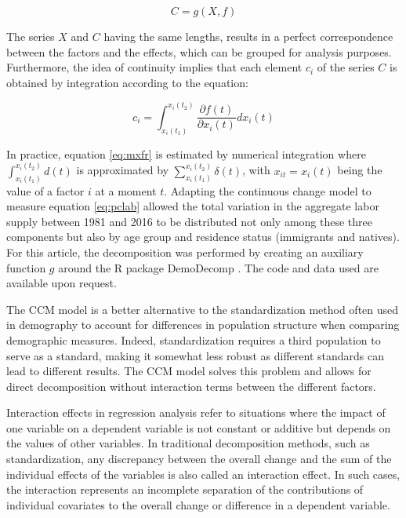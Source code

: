 \begin{equation}\label{eq:gfr}
    C = g(X, f)
\end{equation}

The series \(X\) and \(C\) having the same lengths, results in a perfect correspondence between the factors and the effects, which can be grouped for analysis purposes. Furthermore, the idea of continuity implies that each element \(c_i\) of the series \(C\) is obtained by integration according to the equation:

\begin{equation}\label{eq:mxfr}
    c_i = \int_{x_i(t_1)}^{x_i(t_2)} \frac{\partial f(t)}{\partial x_i(t)} dx_i(t)
\end{equation}

In practice, equation \eqref{eq:mxfr} is estimated by numerical integration where \(\int_{x_i(t_1)}^{x_i(t_2)} d(t)\) is approximated by \(\sum_{x_i(t_1)}^{x_i(t_2)} \delta(t)\), with \(x_{it} = x_i(t)\) being the value of a factor \(i\) at a moment \(t\). Adapting the continuous change model to measure equation \eqref{eq:pclab} allowed the total variation in the aggregate labor supply between 1981 and 2016 to be distributed not only among these three components but also by age group and residence status (immigrants and natives). For this article, the decomposition was performed by creating an auxiliary function \(g\) around the R package \citep{Rstat:2018} DemoDecomp \citep{DemoDecomp:2018}. The code and data used are available upon request.

\vspace{0.7em}\par
The CCM model is a better alternative to the standardization method often used in demography to account for differences in population structure when comparing demographic measures. Indeed, standardization requires a third population to serve as a standard, making it somewhat less robust as different standards can lead to different results. The CCM model solves this problem and allows for direct decomposition without interaction terms between the different factors.

Interaction effects in regression analysis refer to situations where the impact of one variable on a dependent variable is not constant or additive but depends on the values of other variables. In traditional decomposition methods, such as standardization, any discrepancy between the overall change and the sum of the individual effects of the variables is also called an interaction effect. In such cases, the interaction represents an incomplete separation of the contributions of individual covariates to the overall change or difference in a dependent variable.


